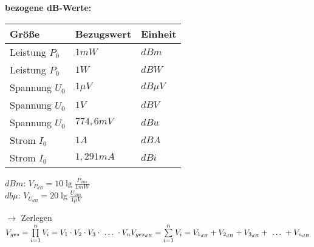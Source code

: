     \begin{minipage}{0.5\columnwidth}
        \textbf{bezogene dB-Werte:}
        \renewcommand{\arraystretch}{0.9}
        \begin{table}[H]
            \centering
            \begin{tabular}{|l|l|l|}
                \hline
                Größe          & Bezugswert & Einheit    \\ \hline
                Leistung $P_0$ & $1mW$      & $dBm$      \\ \hline
                Leistung $P_0$ & $1W$       & $dBW$      \\ \hline
                Spannung $U_0$ & $1\mu V$   & $dB\mu V$  \\ \hline
                Spannung $U_0$ & $1V$       & $dBV$      \\ \hline
                Spannung $U_0$ & $774,6mV$  & $dBu$      \\ \hline
                Strom $I_0$    & $1A$       & $dBA$      \\ \hline
                Strom $I_0$    & $1,291mA$  & $dBi$      \\ \hline
            \end{tabular}
        \end{table}
        $dBm$: $V_{P_{dB}}=10\lg\frac{P_{aus}}{1mW}$\\
        $db\mu$: $V_{U_{dB}}=20\lg\frac{U_{aus}}{1\mu V}$
    \end{minipage}

    $\longrightarrow$ Zerlegen\\
    $V_{ges}=\prod\limits_{i=1}^n V_i=V_1\cdot V_2\cdot V_3\cdot\ \dots\ \cdot V_n\\
    V_{ges_{dB}}=\sum\limits_{i=1}^n V_i=V_{1_{dB}}+V_{2_{dB}}+V_{3_{dB}}+\ \dots\ +V_{n_{dB}}$\\
